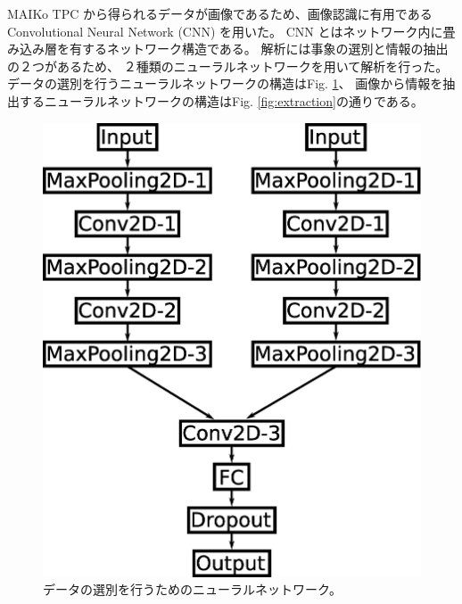 \documentclass{jps-cp}
\begin{document}
MAIKo TPC から得られるデータが画像であるため、画像認識に有用であるConvolutional Neural Network (CNN) を用いた。
CNN とはネットワーク内に畳み込み層を有するネットワーク構造である。
解析には事象の選別と情報の抽出の２つがあるため、
２種類のニューラルネットワークを用いて解析を行った。
データの選別を行うニューラルネットワークの構造はFig. \ref{fig:selection}、
画像から情報を抽出するニューラルネットワークの構造はFig. \ref{fig:extraction}の通りである。
\begin{figure}
  \centering
  \begin{minipage}{0.45\columnwidth}
    \centering
    \includegraphics[clip, width=0.8\columnwidth]{eps/event_selection.eps}
    \caption{データの選別を行うためのニューラルネットワーク。}
    \label{fig:selection}
  \end{minipage}
  \begin{minipage}{0.45\columnwidth}
    \centering

\end{minipage}
\end{figure}
\end{document}
